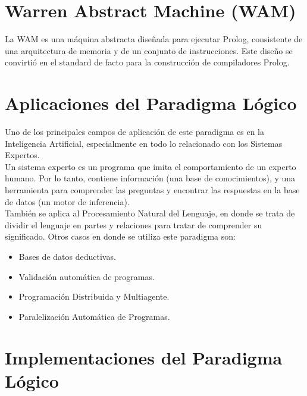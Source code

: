 \documentclass[12pt,titlepage]{article}
\begin{document}
\newpage

\section{Warren Abstract Machine (WAM)}

La WAM es una máquina abstracta diseñada para ejecutar Prolog, consistente de una arquitectura de memoria y de un conjunto de instrucciones. Este diseño se convirtió en el standard de facto para la construcción de compiladores Prolog. \\

\newpage

\section{Aplicaciones del Paradigma Lógico}

Uno de los principales campos de aplicación de este paradigma es en la Inteligencia Artificial, especialmente en todo lo relacionado con los Sistemas Expertos. \\

Un sistema experto es un programa que imita el comportamiento de un experto humano. Por lo tanto, contiene información (una base de conocimientos), y una herramienta para comprender las preguntas y encontrar las respuestas en la base de datos (un motor de inferencia). \\

También se aplica al Procesamiento Natural del Lenguaje, en donde se trata de dividir el lenguaje en partes y relaciones para tratar de comprender su significado.
Otros casos en donde se utiliza este paradigma son: \\
\begin{itemize}
    \item Bases de datos deductivas.
    \item Validación automática de programas.
    \item Programación Distribuida y Multiagente.
    \item Paralelización Automática de Programas.
\end{itemize}

\newpage

\section{Implementaciones del Paradigma Lógico}
\end{document}
